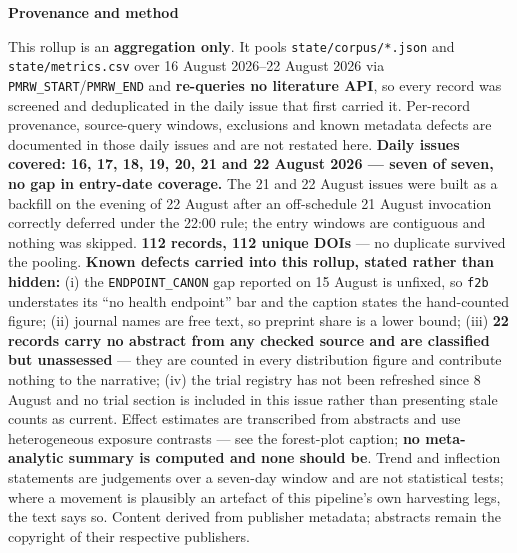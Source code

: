 \documentclass[10pt]{article}
\newcommand{\PERIODSTART}{16 August 2026}
\newcommand{\PERIODEND}{22 August 2026}
\begin{document}
\vspace{4mm}
\begin{keybox}
{\sffamily\bfseries\footnotesize\color{Deep}Provenance and method}\\[1.2mm]
{\fontsize{7.2}{8.8}\selectfont
This rollup is an \textbf{aggregation only}. It pools \texttt{state/corpus/*.json} and
\texttt{state/metrics.csv} over \PERIODSTART{}--\PERIODEND{} via
\texttt{PMRW\_START}/\texttt{PMRW\_END} and \textbf{re-queries no literature API}, so every
record was screened and deduplicated in the daily issue that first carried it. Per-record
provenance, source-query windows, exclusions and known metadata defects are documented in
those daily issues and are not restated here.
\textbf{Daily issues covered: 16, 17, 18, 19, 20, 21 and 22 August 2026 --- seven of seven,
no gap in entry-date coverage.} The 21 and 22 August issues were built as a backfill on the
evening of 22 August after an off-schedule 21 August invocation correctly deferred under
the 22:00 rule; the entry windows are contiguous and nothing was skipped.
\textbf{112 records, 112 unique DOIs} --- no duplicate survived the pooling.
\textbf{Known defects carried into this rollup, stated rather than hidden:}
(i) the \texttt{ENDPOINT\_CANON} gap reported on 15 August is unfixed, so \texttt{f2b}
understates its ``no health endpoint'' bar and the caption states the hand-counted figure;
(ii) journal names are free text, so preprint share is a lower bound;
(iii) \textbf{22 records carry no abstract from any checked source and are classified but
unassessed} --- they are counted in every distribution figure and contribute nothing to the
narrative; (iv) the trial registry has not been refreshed since 8 August and no trial
section is included in this issue rather than presenting stale counts as current.
Effect estimates are transcribed from abstracts and use heterogeneous exposure contrasts
--- see the forest-plot caption; \textbf{no meta-analytic summary is computed and none
should be}. Trend and inflection statements are judgements over a seven-day window and are
not statistical tests; where a movement is plausibly an artefact of this pipeline's own
harvesting legs, the text says so. Content derived from publisher metadata; abstracts
remain the copyright of their respective publishers.\par}
\end{keybox}
\end{document}
